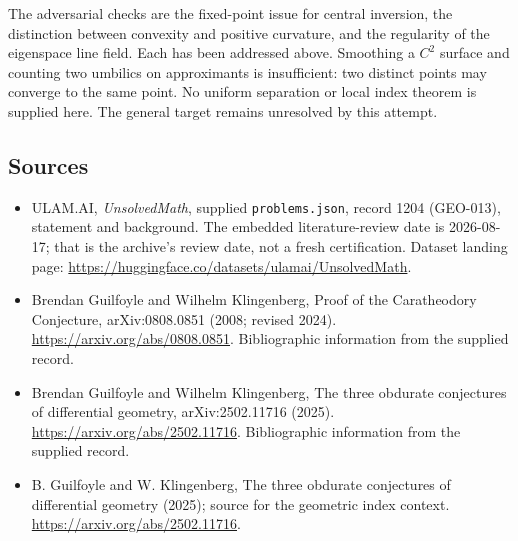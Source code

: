 \documentclass[11pt,a4paper]{article}
\begin{document}
The adversarial checks are the fixed-point issue for central inversion, the distinction between convexity and positive curvature, and the regularity of the eigenspace line field. Each has been addressed above. Smoothing a $C^2$ surface and counting two umbilics on approximants is insufficient: two distinct points may converge to the same point. No uniform separation or local index theorem is supplied here. The general target remains unresolved by this attempt.

\subsection{Sources}

{\small

\begin{itemize}

\item[\hypertarget{source:1204:1}{S1}] ULAM.AI, \emph{UnsolvedMath}, supplied \texttt{problems.json}, record 1204 (GEO-013), statement and background. The embedded literature-review date is 2026-08-17; that is the archive’s review date, not a fresh certification. Dataset landing page: \url{https://huggingface.co/datasets/ulamai/UnsolvedMath}.

\item[\hypertarget{source:1204:2}{S2}] Brendan Guilfoyle and Wilhelm Klingenberg, Proof of the Caratheodory Conjecture, arXiv:0808.0851 (2008; revised 2024). \url{https://arxiv.org/abs/0808.0851}. Bibliographic information from the supplied record.

\item[\hypertarget{source:1204:3}{S3}] Brendan Guilfoyle and Wilhelm Klingenberg, The three obdurate conjectures of differential geometry, arXiv:2502.11716 (2025). \url{https://arxiv.org/abs/2502.11716}. Bibliographic information from the supplied record.

\item[R1] B. Guilfoyle and W. Klingenberg, The three obdurate conjectures of differential geometry (2025); source for the geometric index context.
\url{https://arxiv.org/abs/2502.11716}.
\end{itemize}

}

\label{end:1204}
\end{document}
